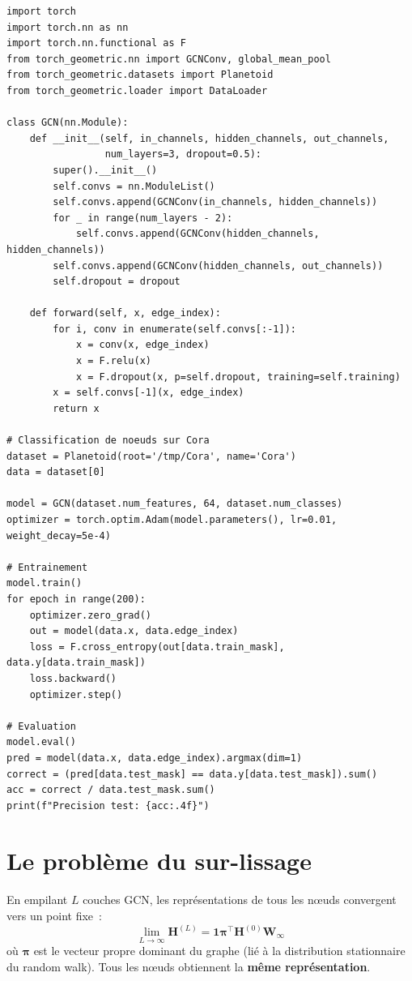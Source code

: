 \begin{codeblock}[title=\textbf{Impl\'ementation GCN compl\`ete}]
\begin{verbatim}
import torch
import torch.nn as nn
import torch.nn.functional as F
from torch_geometric.nn import GCNConv, global_mean_pool
from torch_geometric.datasets import Planetoid
from torch_geometric.loader import DataLoader

class GCN(nn.Module):
    def __init__(self, in_channels, hidden_channels, out_channels,
                 num_layers=3, dropout=0.5):
        super().__init__()
        self.convs = nn.ModuleList()
        self.convs.append(GCNConv(in_channels, hidden_channels))
        for _ in range(num_layers - 2):
            self.convs.append(GCNConv(hidden_channels, hidden_channels))
        self.convs.append(GCNConv(hidden_channels, out_channels))
        self.dropout = dropout

    def forward(self, x, edge_index):
        for i, conv in enumerate(self.convs[:-1]):
            x = conv(x, edge_index)
            x = F.relu(x)
            x = F.dropout(x, p=self.dropout, training=self.training)
        x = self.convs[-1](x, edge_index)
        return x

# Classification de noeuds sur Cora
dataset = Planetoid(root='/tmp/Cora', name='Cora')
data = dataset[0]

model = GCN(dataset.num_features, 64, dataset.num_classes)
optimizer = torch.optim.Adam(model.parameters(), lr=0.01, weight_decay=5e-4)

# Entrainement
model.train()
for epoch in range(200):
    optimizer.zero_grad()
    out = model(data.x, data.edge_index)
    loss = F.cross_entropy(out[data.train_mask], data.y[data.train_mask])
    loss.backward()
    optimizer.step()

# Evaluation
model.eval()
pred = model(data.x, data.edge_index).argmax(dim=1)
correct = (pred[data.test_mask] == data.y[data.test_mask]).sum()
acc = correct / data.test_mask.sum()
print(f"Precision test: {acc:.4f}")
\end{verbatim}
\end{codeblock}

\section{Le probl\`eme du sur-lissage}

\begin{theoreme}
En empilant $L$ couches GCN, les repr\'esentations de tous les n\oe uds
convergent vers un point fixe~:
\[
    \lim_{L \to \infty} \mathbf{H}^{(L)} = \mathbf{1}\boldsymbol{\pi}^\top \mathbf{H}^{(0)} \mathbf{W}_\infty
\]
o\`u $\boldsymbol{\pi}$ est le vecteur propre dominant du graphe (li\'e \`a
la distribution stationnaire du random walk). Tous les n\oe uds obtiennent
la \textbf{m\^eme repr\'esentation}.
\end{theoreme}

